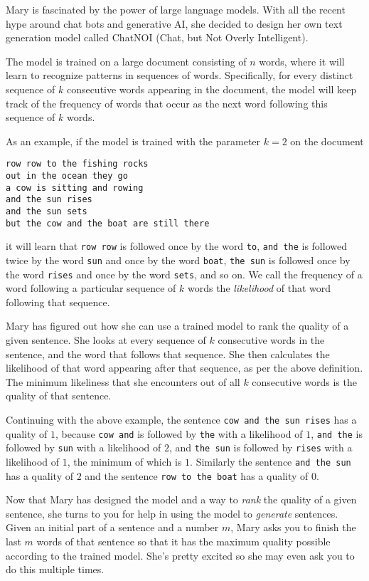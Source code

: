 
Mary is fascinated by the power of large language models. With all the recent
hype around chat bots and generative AI, she decided to design her own text
generation model called ChatNOI (Chat, but Not Overly Intelligent).

The model is trained on a large document consisting of $n$ words, where it will
learn to recognize patterns in sequences of words. Specifically, for every
distinct sequence of $k$ consecutive words appearing in the document, the model
will keep track of the frequency of words that occur as the next word following
this sequence of $k$ words.

As an example, if the model is trained with the parameter $k = 2$ on the document
\begin{verbatim}
row row to the fishing rocks
out in the ocean they go
a cow is sitting and rowing
and the sun rises
and the sun sets
but the cow and the boat are still there
\end{verbatim}
it will learn that \texttt{row row} is followed once by the word \texttt{to},
\texttt{and the} is followed twice by the word \texttt{sun} and once by the
word \texttt{boat}, \texttt{the sun} is followed once by the word
\texttt{rises} and once by the word \texttt{sets}, and so on. We call the
frequency of a word following a particular sequence of $k$ words the
\textit{likelihood} of that word following that sequence.

Mary has figured out how she can use a trained model to rank the quality of a
given sentence. She looks at every sequence of $k$ consecutive words in the
sentence, and the word that follows that sequence. She then calculates the
likelihood of that word appearing after that sequence, as per the above
definition. The minimum likeliness that she encounters out of all $k$
consecutive words is the quality of that sentence.

Continuing with the above example, the sentence \texttt{cow and the sun rises}
has a quality of $1$, because \texttt{cow and} is followed by \texttt{the} with
a likelihood of $1$, \texttt{and the} is followed by \texttt{sun} with a
likelihood of $2$, and \texttt{the sun} is followed by \texttt{rises} with a
likelihood of $1$, the minimum of which is $1$. Similarly the sentence
\texttt{and the sun} has a quality of $2$ and the sentence \texttt{row to the
boat} has a quality of $0$.

Now that Mary has designed the model and a way to \textit{rank} the quality of
a given sentence, she turns to you for help in using the model to
\textit{generate} sentences. Given an initial part of a sentence and a number
$m$, Mary asks you to finish the last $m$ words of that sentence so that it has
the maximum quality possible according to the trained model. She's pretty
excited so she may even ask you to do this multiple times.

